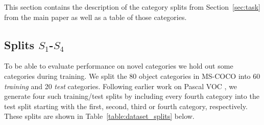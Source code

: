 \documentclass{article}
\newcommand{\coco}{MS-COCO\xspace}
\begin{document}
This section contains the description of the category splits from Section~\ref{sec:task} from the main paper as well as a table of those categories.

\subsection{Splits $S_1$-$S_4$}
To be able to evaluate performance on novel categories we hold out some categories during training. We split the 80 object categories in \coco into 60 \emph{training} and 20 \emph{test} categories.
Following earlier work on Pascal VOC \cite{Shaban2017}, we generate four such training/test splits by including every fourth category into the test split starting with the first, second, third or fourth category, respectively. These splits are shown in Table~\ref{table:dataset_splits} below.
\end{document}
